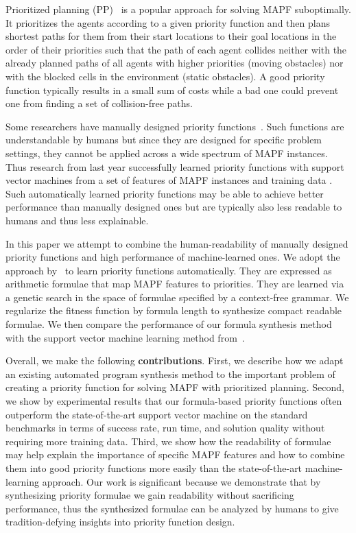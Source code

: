 \documentclass[letterpaper]{article}
\begin{document}
Prioritized planning (PP)~\citep{latombe1991multiple,bennewitz2002finding,silver2005cooperative,van2005prioritized} is a popular approach for solving MAPF suboptimally. It prioritizes the agents according to a given priority function and then plans shortest paths for them from their start locations to their goal locations in the order of their priorities such that the path of each agent collides neither with the already planned paths of all agents with higher priorities (moving obstacles) nor with the blocked cells in the environment (static obstacles). A good priority function typically results in a small sum of costs while a bad one could prevent one from finding a set of collision-free paths.

Some researchers have manually designed priority functions~\citep{van2005prioritized, wang2019new, wu2020multi, buckley1988fast, li2019coupling}. Such functions are understandable by humans but since they are designed for specific problem settings, they cannot be applied across a wide spectrum of MAPF instances. Thus research from last year successfully learned priority functions with support vector machines from a set of features of MAPF instances and training data \citep{zhang2022learning}. Such automatically learned priority functions may be able to achieve better performance than manually designed ones but are typically also less readable to humans and thus less explainable.

In this paper we attempt to combine the human-readability of manually designed priority functions and high performance of machine-learned ones. We adopt the approach by~\citet{bulitko2022portability} to learn priority functions automatically. They are expressed as arithmetic formulae that map MAPF features to priorities. They are learned via a genetic search in the space of formulae specified by a context-free grammar. We regularize the fitness function by formula length to synthesize compact readable formulae. We then compare the performance of our formula synthesis method with the support vector machine learning method from~\citet{zhang2022learning}.

Overall, we make the following \textbf{contributions}. First, we describe how we adapt an existing automated program synthesis method to the important problem of creating a priority function for solving MAPF with prioritized planning. Second, we show by experimental results that our formula-based priority functions often outperform the state-of-the-art support vector machine on the standard benchmarks in terms of success rate, run time, and solution quality without requiring more training data. Third, we show how the readability of formulae may help explain the importance of specific MAPF features and how to combine them into good priority functions more easily than the state-of-the-art machine-learning approach. Our work is significant because we demonstrate that by synthesizing priority formulae we gain readability without sacrificing performance, thus the synthesized formulae can be analyzed by humans to give tradition-defying insights into priority function design.
\end{document}
